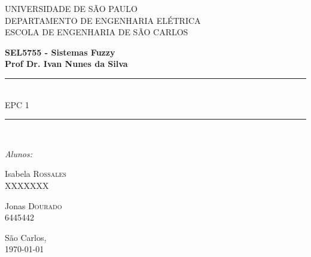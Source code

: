 \documentclass{report}
\begin{document}
\newcommand{\HRule}{\rule{\linewidth}{0.5mm}}
\newcommand{\tsize}[1]{(\frac{W}{L})_{#1}}
 

\begin{titlepage}

\begin{center}


{\LARGE UNIVERSIDADE DE SÃO PAULO\\}
{\LARGE DEPARTAMENTO DE ENGENHARIA ELÉTRICA \\}
{\LARGE ESCOLA DE ENGENHARIA DE SÃO CARLOS\\[4cm]}

\textbf{\large SEL5755 - Sistemas Fuzzy}\\[1cm]
\textbf{\large Prof Dr. Ivan Nunes da Silva}\\[2cm]


\HRule \\[0.6cm]
{ \huge EPC 1\bfseries }\\[0.6cm]

\HRule \\[2cm]


\begin{center} \large
\emph{Alunos:}\\
\end{center}

\begin{minipage}{0.4\textwidth}
\begin{flushleft} \large
Isabela \textsc{Rossales}\\
XXXXXXX
\end{flushleft}
\end{minipage}
\begin{minipage}{0.4\textwidth}
\begin{flushright} \large
Jonas \textsc{Dourado}\\
6445442
\end{flushright}
\end{minipage}

\vfill

{\large São Carlos,\\ \today}

\end{center}

\end{titlepage}
\end{document}
